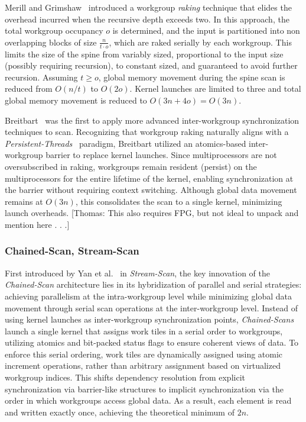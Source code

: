 \documentclass[sigconf]{acmart}
\newcommand{\thomas}[1]{{\footnotesize\color{orange}[Thomas: #1]}}
\begin{document}
Merill and Grimshaw~\cite{Merrill2009} introduced a workgroup \emph{raking} technique that elides the overhead incurred when the recursive depth exceeds two. In this approach, the total workgroup occupancy $o$ is determined, and the input is partitioned into non overlapping blocks of size $\frac{n}{t \cdot o}$, which are raked serially by each workgroup. This limits the size of the spine from variably sized, proportional to the input size (possibly requiring recursion), to constant sized, and guaranteed to avoid further recursion. Assuming $t \geq o$, global memory movement during the spine scan is reduced from $O(n/t)$ to $O(2o)$. Kernel launches are limited to three and total global memory movement is reduced to $O(3n + 4o) = O(3n)$.

Breitbart~\cite{10.5555/2031978.2032029} was the first to apply more advanced inter-workgroup synchronization techniques to scan. Recognizing that workgroup raking naturally aligns with a \emph{Persistent-Threads}~\cite{gupta2012} paradigm, Breitbart utilized an atomics-based inter-workgroup barrier to replace kernel launches. Since multiprocessors are not oversubscribed in raking, workgroups remain resident (persist) on the multiprocessors for the entire lifetime of the kernel, enabling synchronization at the barrier without requiring context switching. Although global data movement remains at $O(3n)$, this consolidates the scan to a single kernel, minimizing launch overheads. \thomas{This also requires FPG, but not ideal to unpack and mention here . . .}

\subsubsection{Chained-Scan, Stream-Scan}
First introduced by Yan et al.~\cite{10.1145/2442516.2442539} in \emph{Stream-Scan}, the key innovation of the \emph{Chained-Scan} architecture lies in its hybridization of parallel and serial strategies: achieving parallelism at the intra-workgroup level while minimizing global data movement through serial scan operations at the inter-workgroup level. Instead of using kernel launches as inter-workgroup synchronization points, \emph{Chained-Scans} launch a single kernel that assigns work tiles in a serial order to workgroups, utilizing atomics and bit-packed status flags to ensure coherent views of data. To enforce this serial ordering, work tiles are dynamically assigned using atomic increment operations, rather than arbitrary assignment based on virtualized workgroup indices. This shifts dependency resolution from explicit synchronization via barrier-like structures to implicit synchronization via the order in which workgroups access global data. As a result, each element is read and written exactly once, achieving the theoretical minimum of $2n$.
\end{document}
